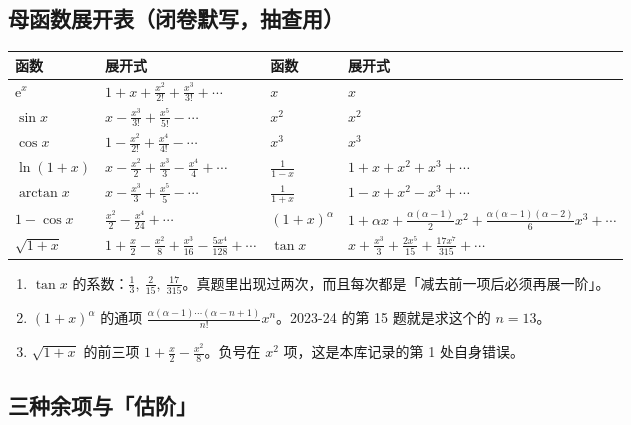 \documentclass[11pt,a4paper]{ctexart}
\newcommand{\ee}{\mathrm{e}}
\begin{document}
\subsection{母函数展开表（闭卷默写，抽查用）}

\begin{center}
\footnotesize
\renewcommand{\arraystretch}{1.25}
\begin{tabularx}{\textwidth}{@{}l X l X@{}}
\toprule
\textbf{函数} & \textbf{展开式} & \textbf{函数} & \textbf{展开式}\\
\midrule
$\ee^{x}$ & $1+x+\frac{x^{2}}{2!}+\frac{x^{3}}{3!}+\cdots$ &
$x$ & $x$\\
$\sin x$ & $x-\frac{x^{3}}{3!}+\frac{x^{5}}{5!}-\cdots$ &
$x^{2}$ & $x^{2}$\\
$\cos x$ & $1-\frac{x^{2}}{2!}+\frac{x^{4}}{4!}-\cdots$ &
$x^{3}$ & $x^{3}$\\
$\ln(1+x)$ & $x-\frac{x^{2}}{2}+\frac{x^{3}}{3}-\frac{x^{4}}{4}+\cdots$ &
$\frac{1}{1-x}$ & $1+x+x^{2}+x^{3}+\cdots$\\
$\arctan x$ & $x-\frac{x^{3}}{3}+\frac{x^{5}}{5}-\cdots$ &
$\frac{1}{1+x}$ & $1-x+x^{2}-x^{3}+\cdots$\\
$1-\cos x$ & $\frac{x^{2}}{2}-\frac{x^{4}}{24}+\cdots$ &
$(1+x)^{\alpha}$ & $1+\alpha x+\frac{\alpha(\alpha-1)}{2}x^{2}+\frac{\alpha(\alpha-1)(\alpha-2)}{6}x^{3}+\cdots$\\
$\sqrt{1+x}$ & $1+\frac{x}{2}-\frac{x^{2}}{8}+\frac{x^{3}}{16}-\frac{5x^{4}}{128}+\cdots$ &
$\tan x$ & $x+\frac{x^{3}}{3}+\frac{2x^{5}}{15}+\frac{17x^{7}}{315}+\cdots$\\
\bottomrule
\end{tabularx}
\end{center}

\begin{keypoint}[表里最该背的三行]
\begin{enumerate}
\item $\tan x$ 的系数：$\frac13,\ \frac{2}{15},\ \frac{17}{315}$。真题里出现过两次，而且每次都是「减去前一项后必须再展一阶」。
\item $(1+x)^{\alpha}$ 的通项 $\frac{\alpha(\alpha-1)\cdots(\alpha-n+1)}{n!}x^{n}$。2023-24 的第 15 题就是求这个的 $n=13$。
\item $\sqrt{1+x}$ 的前三项 $1+\frac{x}{2}-\frac{x^{2}}{8}$。负号在 $x^{2}$ 项，这是本库记录的第 1 处自身错误。
\end{enumerate}
\end{keypoint}

\subsection{三种余项与「估阶」}
\end{document}
